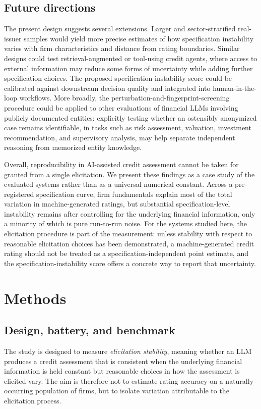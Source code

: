 \documentclass[a4paper,fleqn]{cas-sc}
\begin{document}
\subsection{Future directions}
The present design suggests several extensions. Larger and sector-stratified real-issuer samples would
yield more precise estimates of how specification instability varies with firm characteristics and
distance from rating boundaries. Similar designs could test retrieval-augmented or tool-using credit
agents, where access to external information may reduce some forms of uncertainty while adding further
specification choices. The proposed specification-instability score could be calibrated against downstream
decision quality and integrated into human-in-the-loop workflows. More broadly, the perturbation-and-fingerprint-screening
procedure could be applied to other evaluations of financial LLMs involving publicly documented entities:
explicitly testing whether an ostensibly anonymized case remains identifiable, in tasks such as risk
assessment, valuation, investment recommendation, and supervisory analysis, may help separate independent
reasoning from memorized entity knowledge.

Overall, reproducibility in AI-assisted credit assessment cannot be taken for granted from a single
elicitation. We present these findings as a case study of the evaluated systems rather than as a universal
numerical constant. Across a pre-registered specification curve, firm fundamentals explain most of the total
variation in machine-generated ratings, but substantial specification-level instability remains after
controlling for the underlying financial information, only a minority of which is pure run-to-run noise.
For the systems studied here, the elicitation procedure is part of the measurement: unless stability with
respect to reasonable elicitation choices has been demonstrated, a machine-generated credit rating should
not be treated as a specification-independent point estimate, and the specification-instability score offers
a concrete way to report that uncertainty.

\section{Methods}
\subsection{Design, battery, and benchmark}
The study is designed to measure \emph{elicitation stability}, meaning whether an LLM produces a credit
assessment that is consistent when the underlying financial information is held constant but reasonable
choices in how the assessment is elicited vary. The aim is therefore not to estimate rating accuracy on a
naturally occurring population of firms, but to isolate variation attributable to the elicitation
process.
\end{document}
